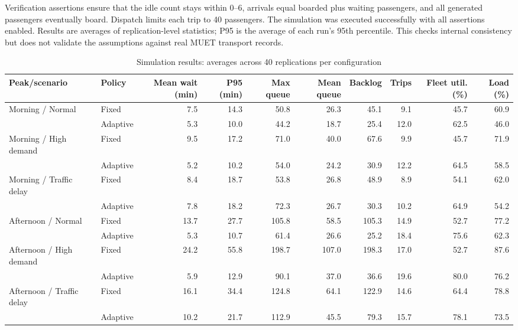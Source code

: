 \documentclass[conference]{IEEEtran}
\begin{document}
Verification assertions ensure that the idle count stays within 0--6, arrivals equal boarded plus waiting passengers, and all generated passengers eventually board. Dispatch limits each trip to 40 passengers. The simulation was executed successfully with all assertions enabled. Results are averages of replication-level statistics; P95 is the average of each run's 95th percentile. This checks internal consistency but does not validate the assumptions against real MUET transport records.
\begin{table}[t]
\caption{Simulation results: averages across 40 replications per configuration}\label{tab:results}
\centering\footnotesize
\begin{tabular}{@{}llrrrrrrrr@{}}\toprule
Peak/scenario & Policy & Mean wait (min)& P95 (min)& Max queue & Mean queue & Backlog & Trips & Fleet util. (\%) & Load (\%)\\\midrule
Morning / Normal & Fixed & 7.5 & 14.3 & 50.8 & 26.3 & 45.1 & 9.1 & 45.7 & 60.9 \\
 & Adaptive & 5.3 & 10.0 & 44.2 & 18.7 & 25.4 & 12.0 & 62.5 & 46.0 \\
Morning / High demand & Fixed & 9.5 & 17.2 & 71.0 & 40.0 & 67.6 & 9.9 & 45.7 & 71.9 \\
 & Adaptive & 5.2 & 10.2 & 54.0 & 24.2 & 30.9 & 12.2 & 64.5 & 58.5 \\
Morning / Traffic delay & Fixed & 8.4 & 18.7 & 53.8 & 26.8 & 48.9 & 8.9 & 54.1 & 62.0 \\
 & Adaptive & 7.8 & 18.2 & 72.3 & 26.7 & 30.3 & 10.2 & 64.9 & 54.2 \\
Afternoon / Normal & Fixed & 13.7 & 27.7 & 105.8 & 58.5 & 105.3 & 14.9 & 52.7 & 77.2 \\
 & Adaptive & 5.3 & 10.7 & 61.4 & 26.6 & 25.2 & 18.4 & 75.6 & 62.3 \\
Afternoon / High demand & Fixed & 24.2 & 55.8 & 198.7 & 107.0 & 198.3 & 17.0 & 52.7 & 87.6 \\
 & Adaptive & 5.9 & 12.9 & 90.1 & 37.0 & 36.6 & 19.6 & 80.0 & 76.2 \\
Afternoon / Traffic delay & Fixed & 16.1 & 34.4 & 124.8 & 64.1 & 122.9 & 14.6 & 64.4 & 78.8 \\
 & Adaptive & 10.2 & 21.7 & 112.9 & 45.5 & 79.3 & 15.7 & 78.1 & 73.5 \\
\bottomrule\end{tabular}
\end{table}
\end{document}
